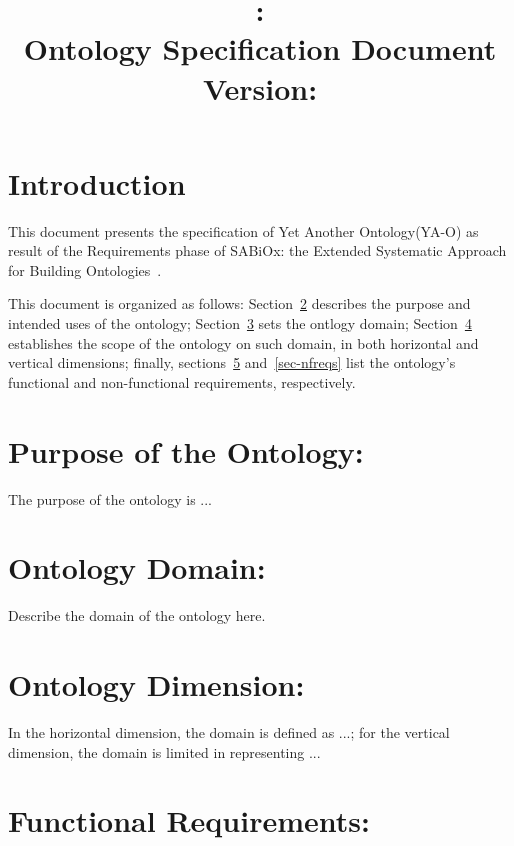 \documentclass[table,usenames,dvipsnames]{article}
\title{\ontologyacronym: \ontologyname
	\\{\large Ontology Specification Document}
	\\{\normalsize Version: \documentversion}}
\author{\authorname}
\newcommand{\sabiox}{SABiOx\xspace}
\newcommand{\sabioxfull}{Extended Systematic Approach for Building Ontologies\xspace}
\newcommand{\ontologyacronym}{YA-O\xspace}
\newcommand{\ontologyname}{Yet Another Ontology\xspace}
\begin{document}
\maketitle


\section{Introduction}

This document presents the specification of \ontologyname (\ontologyacronym) as result of the Requirements phase of \sabiox: the \sabioxfull~\cite{aguiar-souza:report24}.

This document is organized as follows:
Section~\ref{sec-purpose} describes the purpose and intended uses of the ontology;
Section~\ref{sec-domain} sets the ontlogy domain;
Section~\ref{sec-dimension} establishes the scope of the ontology on such domain, in both horizontal and vertical dimensions; finally, 
sections~\ref{sec-freqs} and~\ref{sec-nfreqs} list the ontology's functional and non-functional requirements, respectively.



\section{Purpose of the Ontology:}
\label{sec-purpose}

The purpose of the ontology is ...



\section{Ontology Domain:}
\label{sec-domain}

Describe the domain of the ontology here.



\section{Ontology Dimension:}
\label{sec-dimension}

In the horizontal dimension, the domain is defined as ...; for the vertical dimension, the domain is limited in representing ...



\section{Functional Requirements:}
\label{sec-freqs}
\end{document}
